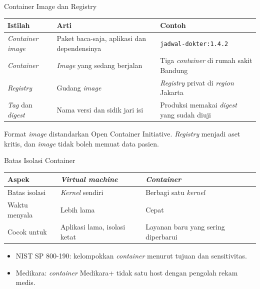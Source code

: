 \documentclass[aspectratio=169, table, 12pt]{beamer}
\begin{document}
\begin{frame}{{\Large Container Image dan Registry}}
  \footnotesize
  \begin{tabularx}{\textwidth}{>{\raggedright\arraybackslash}p{2.6cm}
      >{\raggedright\arraybackslash}X >{\raggedright\arraybackslash}X}
    \hline
    \textbf{Istilah} & \textbf{Arti} & \textbf{Contoh} \\
    \hline
    \textit{Container image} & Paket baca-saja, aplikasi dan dependensinya &
      \texttt{jadwal-dokter:1.4.2} \\
    \hline
    \textit{Container} & \textit{Image} yang sedang berjalan & Tiga
      \textit{container} di rumah sakit Bandung \\
    \hline
    \textit{Registry} & Gudang \textit{image} & \textit{Registry} privat di
      \textit{region} Jakarta \\
    \hline
    \textit{Tag} dan \textit{digest} & Nama versi dan sidik jari isi &
      Produksi memakai \textit{digest} yang sudah diuji \\
    \hline
  \end{tabularx}

  \vspace{8pt}
  \small
  Format \textit{image} distandarkan Open Container Initiative.
  \textit{Registry} menjadi aset kritis, dan \textit{image} tidak boleh
  memuat data pasien.
\end{frame}

\begin{frame}{{\Large Batas Isolasi Container}}
  \footnotesize
  \begin{tabularx}{\textwidth}{>{\raggedright\arraybackslash}p{2.6cm}
      >{\raggedright\arraybackslash}X >{\raggedright\arraybackslash}X}
    \hline
    \textbf{Aspek} & \textbf{\textit{Virtual machine}} &
      \textbf{\textit{Container}} \\
    \hline
    Batas isolasi & \textit{Kernel} sendiri & Berbagi satu \textit{kernel} \\
    \hline
    Waktu menyala & Lebih lama & Cepat \\
    \hline
    Cocok untuk & Aplikasi lama, isolasi ketat & Layanan baru yang sering
      diperbarui \\
    \hline
  \end{tabularx}

  \vspace{6pt}
  \small
  \begin{itemize}
    \item NIST SP 800-190: kelompokkan \textit{container} menurut tujuan dan
          sensitivitas.
    \item Medikara: \textit{container} Medikara+ tidak satu host dengan
          pengolah rekam medis.
  \end{itemize}
\end{frame}
\end{document}
